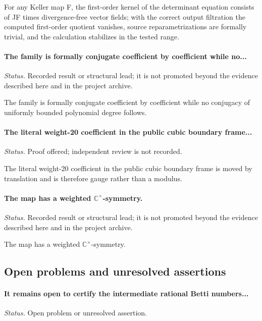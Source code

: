 For any Keller map F, the first-order kernel of the determinant equation consists of JF times divergence-free vector fields; with the correct output filtration the computed first-order quotient vanishes, source reparametrizations are formally trivial, and the calculation stabilizes in the tested range.

\label{supp-note-03-011}
\paragraph{The family is formally conjugate coefficient by coefficient while no...}
\emph{Status.} Recorded result or structural lead; it is not promoted beyond the evidence described here and in the project archive.

The family is formally conjugate coefficient by coefficient while no conjugacy of uniformly bounded polynomial degree follows.

\label{supp-note-03-012}
\paragraph{The literal weight-20 coefficient in the public cubic boundary frame...}
\emph{Status.} Proof offered; independent review is not recorded.

The literal weight-20 coefficient in the public cubic boundary frame is moved by translation and is therefore gauge rather than a modulus.

\label{supp-note-03-013}
\paragraph{The map has a weighted \(\mathbb C^\times\)-symmetry.}
\emph{Status.} Recorded result or structural lead; it is not promoted beyond the evidence described here and in the project archive.

The map has a weighted \(\mathbb C^\times\)-symmetry.

\subsection{Open problems and unresolved assertions}

\label{supp-note-03-014}
\paragraph{It remains open to certify the intermediate rational Betti numbers...}
\emph{Status.} Open problem or unresolved assertion.

